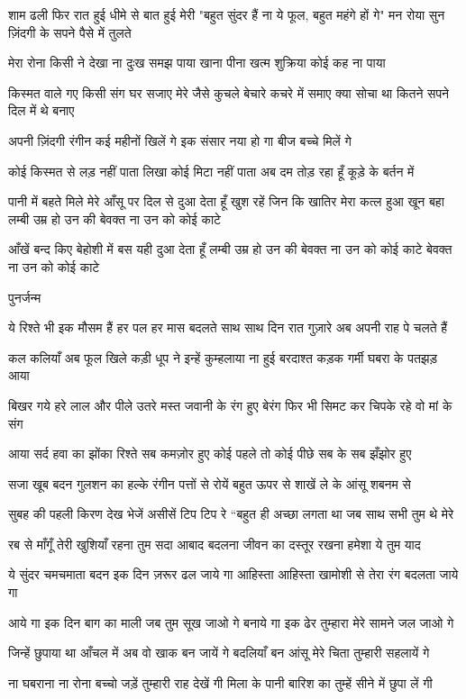शाम ढली फिर रात हुई धीमे से बात हुई मेरी
"बहुत सुंदर हैं ना ये फूल, बहुत महंगे हों गे"
मन रोया सुन ज़िंदगी के सपने पैसे में तुलते

मेरा रोना किसी ने देखा ना दुःख समझ पाया
खाना पीना खत्म शुक्रिया कोई कह ना पाया

किस्मत वाले गए किसी संग घर सजाए
मेरे जैसे कुचले बेचारे कचरे में समाए
क्या सोचा था कितने सपने दिल में थे बनाए

अपनी ज़िंदगी रंगीन कई महीनों खिलें गे
इक संसार नया हो गा बीज बच्चे मिलें गे

कोई किस्मत से लड़ नहीं पाता
लिखा कोई मिटा नहीं पाता
अब दम तोड़ रहा हूँ कूड़े के बर्तन में

पानी में बहते मिले मेरे आँसू
पर दिल से दुआ देता हूँ
खुश रहें जिन कि खातिर
मेरा कत्ल हुआ खून बहा
लम्बी उम्र हो उन की
बेवक्त ना उन को कोई काटे





आँखें बन्द किए बेहोशी में
बस यही दुआ देता हूँ
लम्बी उम्र हो उन की
बेवक्त ना उन को कोई काटे
बेवक्त ना उन को कोई काटे

पुनर्जन्म

ये रिश्ते भी इक मौसम हैं
हर पल हर मास बदलते
साथ साथ दिन रात गुज़ारे
अब अपनी राह पे चलते हैं





कल कलियाँ अब फूल खिले
कड़ी धूप ने इन्हें कुम्हलाया
ना हुई बरदाश्त कड़क गर्मी
घबरा के पतझड़ आया

बिखर गये हरे लाल और पीले
उतरे मस्त जवानी के रंग
हुए बेरंग फिर भी सिमट कर
चिपके रहे वो मां के संग


आया सर्द हवा का झोंका
रिश्ते सब कमज़ोर हुए
कोई पहले तो कोई पीछे
सब के सब झँझोर हुए

सजा खूब बदन गुलशन का
हल्के रंगीन पत्तों से
रोयें बहुत ऊपर से शाखें
ले के आंसू शबनम से


सुबह की पहली किरण देख
भेजें असीसें टिप टिप रे
“बहुत ही अच्छा लगता था
जब साथ सभी तुम थे मेरे

रब से माँगूँ तेरी खुशियाँ
रहना तुम सदा आबाद
बदलना जीवन का दस्तूर
रखना हमेशा ये तुम याद


ये सुंदर चमचमाता बदन
इक दिन ज़रूर ढल जाये गा
आहिस्ता आहिस्ता खामोशी से
तेरा रंग बदलता जाये गा

आये गा इक दिन बाग का माली
जब तुम सूख जाओ गे
बनाये गा इक ढेर तुम्हारा
मेरे सामने जल जाओ गे


जिन्हें छुपाया था आँचल में
अब वो खाक बन जायें गे
बदलियाँ बन आंसू मेरे
चिता तुम्हारी सहलायें गे

ना घबराना ना रोना बच्चो
जड़ें तुम्हारी राह देखें गी
मिला के पानी बारिश का
तुम्हें सीने में छुपा लें गी


